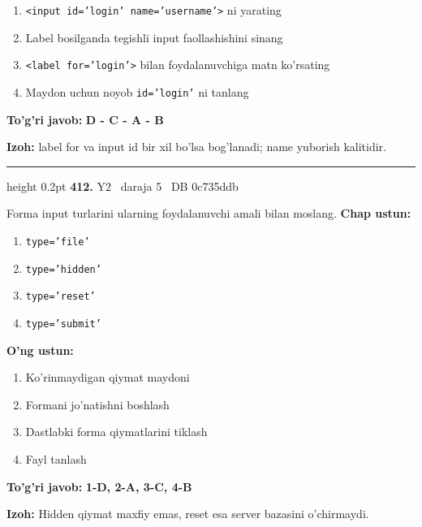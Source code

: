 \documentclass[10pt,a4paper,oneside]{article}
\begin{document}
\begin{enumerate}[label=\Alph*),leftmargin=9mm]
\item \texttt{\textless{}input id='login' name='username'\textgreater{}} ni yarating
\item Label bosilganda tegishli input faollashishini sinang
\item \texttt{\textless{}label for='login'\textgreater{}} bilan foydalanuvchiga matn ko'rsating
\item Maydon uchun noyob \texttt{id='login'} ni tanlang
\end{enumerate}
\begin{tcolorbox}[enhanced,breakable,colback=teal!4,colframe=teal!45!black,boxrule=0.45pt,arc=1.2mm,left=2.8mm,right=2.8mm,top=2mm,bottom=2mm,before skip=2mm,after skip=2mm]
\textbf{\color{teal}To'g'ri javob:} \textbf{D - C - A - B}
\par\smallskip
\textbf{Izoh:} label for va input id bir xil bo'lsa bog'lanadi; name yuborish kalitidir.
\end{tcolorbox}
\vspace{2mm}\hrule height 0.2pt \vspace{4mm}
\hypertarget{q412}{\textbf{\color{ink}412.}}  {\color{muted}\scriptsize Y2 \textbullet\ daraja 5 \textbullet\ DB 0c735ddb}
\par
Forma input turlarini ularning foydalanuvchi amali bilan moslang.
\textbf{\footnotesize Chap ustun:}
\begin{enumerate}[label=\arabic*),leftmargin=9mm]
\item \texttt{type='file'}
\item \texttt{type='hidden'}
\item \texttt{type='reset'}
\item \texttt{type='submit'}
\end{enumerate}
\textbf{\footnotesize O'ng ustun:}
\begin{enumerate}[label=\Alph*),leftmargin=9mm]
\item Ko'rinmaydigan qiymat maydoni
\item Formani jo'natishni boshlash
\item Dastlabki forma qiymatlarini tiklash
\item Fayl tanlash
\end{enumerate}
\begin{tcolorbox}[enhanced,breakable,colback=teal!4,colframe=teal!45!black,boxrule=0.45pt,arc=1.2mm,left=2.8mm,right=2.8mm,top=2mm,bottom=2mm,before skip=2mm,after skip=2mm]
\textbf{\color{teal}To'g'ri javob:} \textbf{1-D, 2-A, 3-C, 4-B}
\par\smallskip
\textbf{Izoh:} Hidden qiymat maxfiy emas, reset esa server bazasini o'chirmaydi.
\end{tcolorbox}
\end{document}
